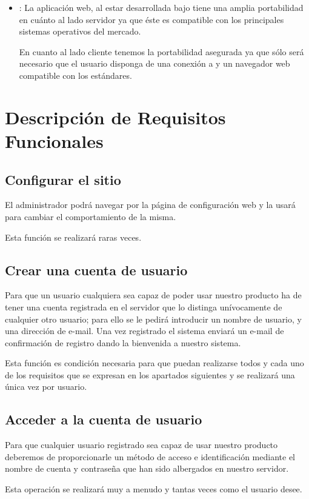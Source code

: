 \begin{itemize}
\item {}: La aplicación web, al estar desarrollada bajo
   tiene una amplia portabilidad en cuánto al lado
  servidor ya que éste es compatible con los principales sistemas operativos del
  mercado.

  En cuanto al lado cliente tenemos la portabilidad asegurada ya que sólo será
  necesario que el usuario disponga de una conexión a  y un
  navegador web compatible con los estándares.
\end{itemize}

\section{Descripción de Requisitos Funcionales}

\subsection{Configurar el sitio}
El administrador podrá navegar por la página de configuración web y la usará
para cambiar el comportamiento de la misma.

Esta función se realizará raras veces.
\subsection{Crear una cuenta de usuario}
Para que un usuario cualquiera sea capaz de poder usar nuestro producto ha de
tener una cuenta registrada en el servidor que lo distinga unívocamente de
cualquier otro usuario; para ello se le pedirá introducir un nombre de usuario,
y una dirección de e-mail. Una vez registrado el sistema enviará un e-mail de
confirmación de registro dando la bienvenida a nuestro sistema.

Esta función es condición necesaria para que puedan realizarse todos y cada uno
de los requisitos que se expresan en los apartados siguientes y se realizará una
única vez por usuario.

\subsection{Acceder a la cuenta de usuario}
Para que cualquier usuario registrado sea capaz de usar nuestro producto
deberemos de proporcionarle un método de acceso e identificación mediante el
nombre de cuenta y contraseña que han sido albergados en nuestro servidor.

Esta operación se realizará muy a menudo y tantas veces como el usuario desee.
